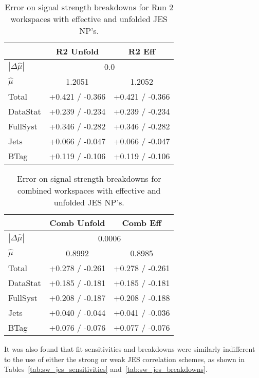 \begin{table}[!htbp]\captionsetup{justification=centering}
\caption{Error on signal strength breakdowns for Run 2 workspaces with effective and unfolded JES NP's.}
\begin{center}\begin{tabular}{lcc}
\hline\hline
 & R2 Unfold & R2 Eff\\
\hline
$\left|\Delta\hat{\mu}\right|$ &  \multicolumn{2}{c}{0.0}\\
$\hat{\mu}$ & 1.2051 & 1.2052\\
\hline
Total & +0.421 / -0.366  &  +0.421 / -0.366\\
DataStat &  +0.239 / -0.234  &  +0.239 / -0.234\\
FullSyst &  +0.346 / -0.282  &  +0.346 / -0.282\\
\hline
Jets &  +0.066 / -0.047  &  +0.066 / -0.047\\
BTag &  +0.119 / -0.106  &  +0.119 / -0.106\\
\hline
\hline
\end{tabular}
\label{tab:unfold_jes_breakdowns2}
\end{center}
\end{table}


\begin{table}[!htbp]\captionsetup{justification=centering}
\caption{Error on signal strength breakdowns for combined workspaces with effective and unfolded JES NP's.}
\begin{center}\begin{tabular}{lcc}
\hline\hline
 & Comb Unfold & Comb Eff\\
\hline
$\left|\Delta\hat{\mu}\right|$ &  \multicolumn{2}{c}{0.0006}\\
$\hat{\mu}$ & 0.8992 & 0.8985\\
\hline
Total &  +0.278 / -0.261  &  +0.278 / -0.261 \\
DataStat &  +0.185 / -0.181  &  +0.185 / -0.181 \\
FullSyst &  +0.208 / -0.187  &  +0.208 / -0.188 \\
\hline
Jets &  +0.040 / -0.044  &  +0.041 / -0.036 \\
BTag &  +0.076 / -0.076  &  +0.077 / -0.076 \\
\hline
\hline
\end{tabular}
\label{tab:unfold_jes_breakdownsc}
\end{center}
\end{table}

It was also found that fit sensitivities and breakdowns were similarly indifferent to the use of either the strong or weak JES correlation schemes, as shown in Tables~\ref{tab:sw_jes_sensitivities} and~\ref{tab:sw_jes_breakdowns}.

